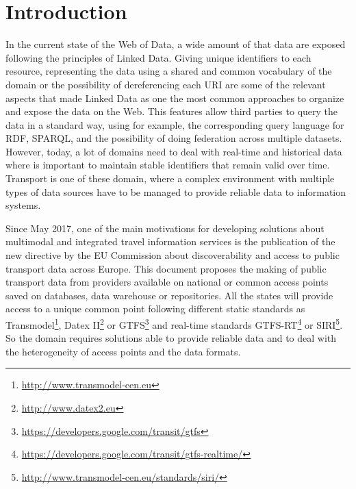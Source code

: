 \documentclass[sw]{iosart2x}
\begin{document}

\section{Introduction}\label{introduction} %
In the current state of the Web of Data, a wide amount of that data are exposed following the principles of Linked Data\cite{bizer2009linked}. Giving unique identifiers to each resource, representing the data using a shared and common vocabulary of the domain or the possibility of dereferencing each URI are some of the relevant aspects that made Linked Data as one the most common approaches to organize and expose the data on the Web\cite{heath2011linked}. This features allow third parties to query the data in a standard way, using for example, the corresponding query language for RDF, SPARQL\cite{prud2006sparql}, and the possibility of doing federation across multiple datasets\cite{buil2013federating}. However, today, a lot of domains need to deal with real-time and historical data where is important to maintain stable identifiers that remain valid over time. Transport is one of these domain, where a complex environment with multiple types of data sources have to be managed to provide reliable data to information systems.

Since May 2017, one of the main motivations for developing solutions about multimodal and integrated travel information services is the publication of the new directive by the EU Commission about discoverability and access to public transport data across Europe. This document proposes the making of public transport data from providers available on national or common access points saved on databases, data warehouse or repositories. All the states will provide access to a unique common point following different static standards as Transmodel\footnote{\url{http://www.transmodel-cen.eu}}, Datex II\footnote{\url{http://www.datex2.eu}} or GTFS\footnote{\url{https://developers.google.com/transit/gtfs}} and real-time standards GTFS-RT\footnote{\url{https://developers.google.com/transit/gtfs-realtime/}} or SIRI\footnote{\url{http://www.transmodel-cen.eu/standards/siri/}}. So the domain requires solutions able to provide reliable data and to deal with the heterogeneity of access points and the data formats.
\end{document}
